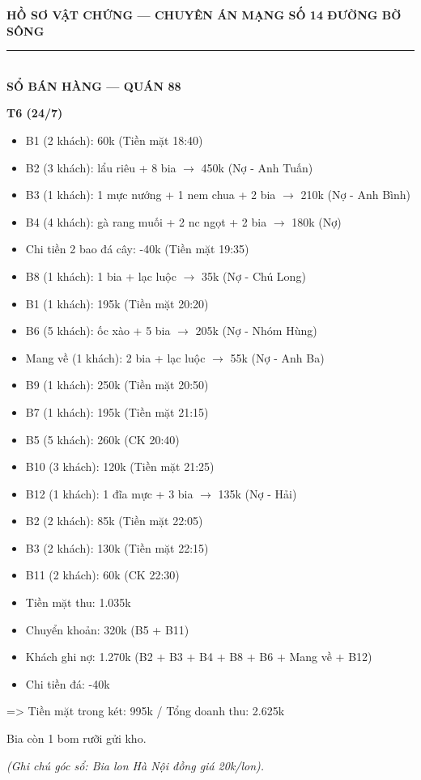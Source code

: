 \documentclass[12pt,a4paper]{article}
\begin{document}
\begin{center}
    \fontsize{11pt}{13pt}\selectfont
    \textbf{HỒ SƠ VẬT CHỨNG — CHUYÊN ÁN MẠNG SỐ 14 ĐƯỜNG BỜ SÔNG}\\[-0.2em]
    \rule{6cm}{0.6pt}\\[0.5cm]
    \textbf{\Large SỔ BÁN HÀNG — QUÁN 88}\\[0.15cm]
    \textit{}
\end{center}
\vspace{0.3cm}

\textbf{T6 (24/7)}


\begin{itemize}[leftmargin=*, itemsep=2pt, topsep=2pt, parsep=0pt]
  \item B1 (2 khách): 60k (Tiền mặt 18:40)
  \item B2 (3 khách): lẩu riêu + 8 bia $\rightarrow$ 450k (Nợ - Anh Tuấn)
  \item B3 (1 khách): 1 mực nướng + 1 nem chua + 2 bia $\rightarrow$ 210k (Nợ - Anh Bình)
  \item B4 (4 khách): gà rang muối + 2 nc ngọt + 2 bia $\rightarrow$ 180k (Nợ)
  \item Chi tiền 2 bao đá cây: -40k (Tiền mặt 19:35)
  \item B8 (1 khách): 1 bia + lạc luộc $\rightarrow$ 35k (Nợ - Chú Long)
  \item B1 (1 khách): 195k (Tiền mặt 20:20)
  \item B6 (5 khách): ốc xào + 5 bia $\rightarrow$ 205k (Nợ - Nhóm Hùng)
  \item Mang về (1 khách): 2 bia + lạc luộc $\rightarrow$ 55k (Nợ - Anh Ba)
  \item B9 (1 khách): 250k (Tiền mặt 20:50)
  \item B7 (1 khách): 195k (Tiền mặt 21:15)
  \item B5 (5 khách): 260k (CK 20:40)
  \item B10 (3 khách): 120k (Tiền mặt 21:25)
  \item B12 (1 khách): 1 đĩa mực + 3 bia $\rightarrow$ 135k (Nợ - Hải)
  \item B2 (2 khách): 85k (Tiền mặt 22:05)
  \item B3 (2 khách): 130k (Tiền mặt 22:15)
  \item B11 (2 khách): 60k (CK 22:30)

  \item Tiền mặt thu: 1.035k
  \item Chuyển khoản: 320k (B5 + B11)
  \item Khách ghi nợ: 1.270k (B2 + B3 + B4 + B8 + B6 + Mang về + B12)
  \item Chi tiền đá: -40k
\end{itemize}
=> Tiền mặt trong két: 995k / Tổng doanh thu: 2.625k


Bia còn 1 bom rưỡi gửi kho.


\textit{(Ghi chú góc sổ: Bia lon Hà Nội đồng giá 20k/lon).}
\end{document}
